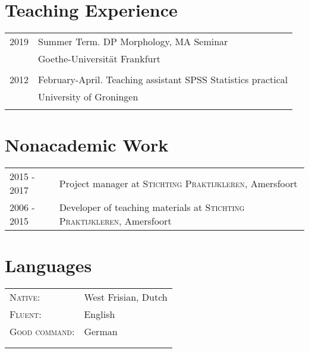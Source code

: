 \documentclass[12pt]{article}
\begin{document}
\section{Teaching Experience}
\begin{tabular}{p{3cm}l}
	\textsc{2019} & Summer Term. DP Morphology, MA Seminar\\
	& Goethe-Universität Frankfurt\\\multicolumn{2}{c}{} \\
	\textsc{2012} & February-April. Teaching assistant SPSS Statistics practical\\
	& University of Groningen\\\multicolumn{2}{c}{} \\
\end{tabular}

\section{Nonacademic Work}
\begin{tabular}{p{3cm}l}
\textsc{2015 - 2017} & Project manager at \textsc{Stichting Praktijkleren}, Amersfoort\\
\textsc{2006 - 2015} & Developer of teaching materials at \textsc{Stichting Praktijkleren}, Amersfoort\\
\end{tabular}

\section{Languages}
\begin{tabular}{p{3cm}l}
\textsc{Native}: &West Frisian, Dutch\\
\textsc{Fluent}: &English\\
\textsc{Good command}: &German\\&\\&\\
\end{tabular}
\end{document}
